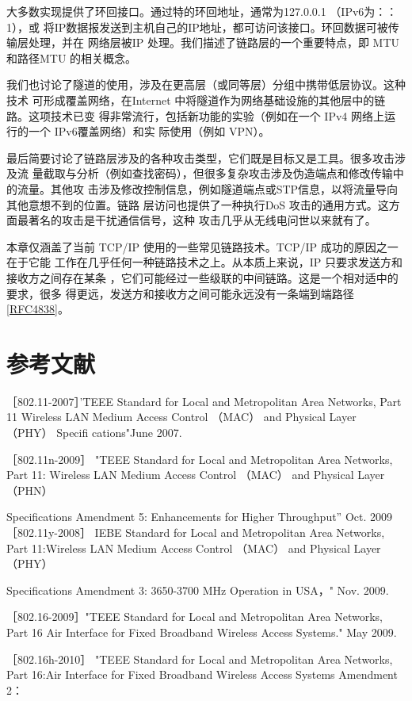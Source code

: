 大多数实现提供了环回接口。通过特的环回地址，通常为127.0.0.1 （IPv6为：：1），或
将IP数据报发送到主机自己的IP地址，都可访问该接口。环回数据可被传输层处理，并在
网络层被IP 处理。我们描述了链路层的一个重要特点，即 MTU 和路径MTU 的相关概念。

我们也讨论了隧道的使用，涉及在更高层（或同等层）分组中携带低层协议。这种技术
可形成覆盖网络，在Internet 中将隧道作为网络基础设施的其他层中的链路。这项技术已变
得非常流行，包括新功能的实验（例如在一个 IPv4 网络上运行的一个 IPv6覆盖网络）和实
际使用（例如 VPN）。

最后简要讨论了链路层涉及的各种攻击类型，它们既是目标又是工具。很多攻击涉及流
量截取与分析（例如查找密码），但很多复杂攻击涉及伪造端点和修改传输中的流量。其他攻
击涉及修改控制信息，例如隧道端点或STP信息，以将流量导向其他意想不到的位置。链路
层访问也提供了一种执行DoS 攻击的通用方式。这方面最著名的攻击是干扰通信信号，这种
攻击几乎从无线电问世以来就有了。

本章仅涵盖了当前 TCP/IP 使用的一些常见链路技术。TCP/IP 成功的原因之一在于它能
工作在几乎任何一种链路技术之上。从本质上来说，IP 只要求发送方和接收方之间存在某条
，它们可能经过一些级联的中间链路。这是一个相对适中的要求，很多
得更远，发送方和接收方之间可能永远没有一条端到端路径\href{https://www.rfc-editor.org/rfc/rfc4838}{[RFC4838]}。

\section{参考文献}

［802.11-2007］'TEEE Standard for Local and Metropolitan Area Networks, Part 11
Wireless LAN Medium Access Control （MAC） and Physical Layer （PHY） Specifi
cations"June 2007.

［802.11n-2009］ "TEEE Standard for Local and Metropolitan Area Networks, Part
11: Wireless LAN Medium Access Control （MAC） and Physical Layer （PHN）

Specifications Amendment 5: Enhancements for Higher Throughput” Oct. 2009
［802.11y-2008］ IEBE Standard for Local and Metropolitan Area Networks, Part
11:Wireless LAN Medium Access Control （MAC） and Physical Layer （PHY）

Specifications Amendment 3: 3650-3700 MHz Operation in USA，" Nov. 2009.

［802.16-2009］"TEEE Standard for Local and Metropolitan Area Networks, Part 16
Air Interface for Fixed Broadband Wireless Access Systems." May 2009.

［802.16h-2010］ "TEEE Standard for Local and Metropolitan Area Networks, Part
16:Air Interface for Fixed Broadband Wireless Access Systems Amendment 2：

